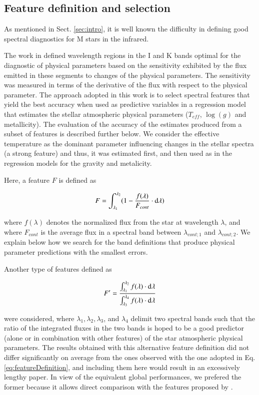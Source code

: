 \subsection{Feature definition and selection}
\label{subsec:FD}
As mentioned in Sect. \ref{sec:intro}, it is well known the
difficulty in defining good spectral diagnostics for M stars in the
infrared.

The work in \cite{cesetti} defined wavelength regions in the I and K
bands optimal for the diagnostic of physical parameters based on the
sensitivity exhibited by the flux emitted in these segments to changes
of the physical parameters. The sensitivity was measured in terms of
the derivative of the flux with respect to the physical parameter. The
approach adopted in this work is to select spectral features that
yield the best accuracy when used as predictive variables in a
regression model that estimates the stellar atmospheric physical
parameters ($T_{eff}$, $\log(g)$ and metallicity). The evaluation of
the accuracy of the estimates produced from a subset of features is
described further below. We consider the effective temperature as the
dominant parameter influencing changes in the stellar spectra (a
strong feature) and thus, it was estimated first, and then used as in
the regression models for the gravity and metalicity.

Here, a feature $F$ is defined as

\begin{equation}\label{eq:featureDefinition}
  F = \int_{\lambda_{1}}^{\lambda_{2}} (1-\frac{f(\lambda)}{F_{cont}} \cdot {\rm d}{\lambda})
\end{equation}

where $f(\lambda)$ denotes the normalized flux from the star at
wavelength $\lambda$, and where $F_{cont}$ is the average flux in a
spectral band between $\lambda_{cont;1}$ and $\lambda_{cont;2}$. We
explain below how we search for the band definitions that produce
physical parameter predictions with the smallest errors.

Another type of features defined as

\begin{equation}\label{eq:feature2}
  F' = \frac{ \int_{\lambda_{1}}^{\lambda_{2}}f(\lambda) \cdot {\rm d}{\lambda}}
               {\int_{\lambda_{3}}^{\lambda_{4}} f(\lambda) \cdot {\rm d}{\lambda}} 
\end{equation}

were considered, where $\lambda_1, \lambda_2, \lambda_3$, and
$\lambda_4$ delimit two spectral bands such that the ratio of the
integrated fluxes in the two bands is hoped to be a good predictor
(alone or in combination with other features) of the star atmospheric
physical parameters. The results obtained with this alternative
feature definition did not differ significantly on average from the
ones observed with the one adopted in Eq. \ref{eq:featureDefinition}, and
including them here would result in an excessively lengthy paper. In
view of the equivalent global performances, we prefered the former
because it allows direct comparison with the features proposed
by \cite{cesetti}.

